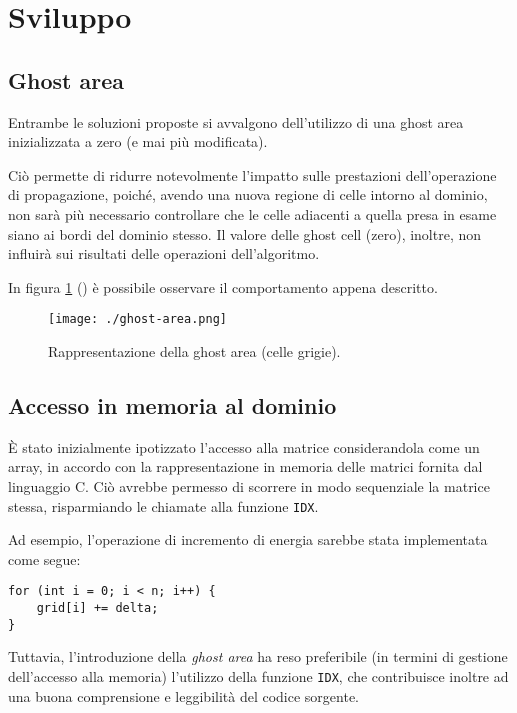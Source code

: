 \section{Sviluppo}

\subsection{Ghost area}

Entrambe le soluzioni proposte si avvalgono dell'utilizzo di una ghost area
inizializzata a zero (e mai più modificata).

Ciò permette di ridurre notevolmente l'impatto sulle prestazioni
dell'operazione di propagazione, poiché, avendo una nuova regione di celle
intorno al dominio, non sarà più necessario controllare che le celle adiacenti a
quella presa in esame siano ai bordi del dominio stesso.
Il valore delle ghost cell (zero), inoltre, non influirà sui risultati delle
operazioni dell'algoritmo.

In figura \ref{fig:ghostarea} (\cite{marzollaghost}) è possibile osservare il
comportamento appena descritto.

\begin{figure}[!ht]
  \centering
  \texttt{[image: ./ghost-area.png]}
  \caption{Rappresentazione della ghost area (celle
  grigie).}\label{fig:ghostarea}
\end{figure}

\subsection{Accesso in memoria al dominio}

È stato inizialmente ipotizzato l'accesso alla matrice considerandola come un
array, in accordo con la rappresentazione in memoria delle matrici fornita dal
linguaggio C.
Ciò avrebbe permesso di scorrere in modo sequenziale la matrice stessa,
risparmiando le chiamate alla funzione \texttt{IDX}.

Ad esempio, l'operazione di incremento di energia sarebbe stata implementata
come segue:
\begin{verbatim}
for (int i = 0; i < n; i++) {
    grid[i] += delta;
}
\end{verbatim}

Tuttavia, l'introduzione della \textit{ghost area} ha reso preferibile (in
termini di gestione dell'accesso alla memoria) l'utilizzo della funzione
\texttt{IDX}, che contribuisce inoltre ad una buona comprensione e leggibilità
del codice sorgente.

